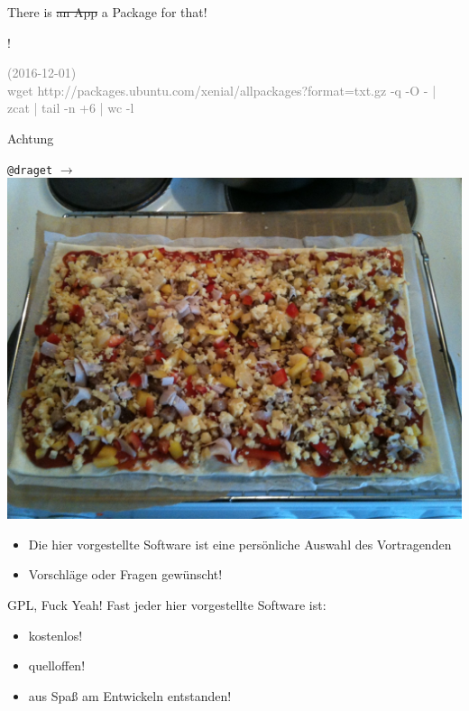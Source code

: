 \begin{frame}{There is \st{an App} a Package for that!}

\begin{center}
{\fontsize{100}{90}!}
\end{center}
\vfill

\textcolor{gray}{\tiny (2016-12-01) \\ wget http://packages.ubuntu.com/xenial/allpackages?format=txt.gz -q -O - | zcat | tail -n +6 | wc -l}
\end{frame}


\begin{frame}{Achtung}
\begin{center}
\texttt{@draget} $ \rightarrow $ \includegraphics[scale=0.12]{images/draget}
\end{center}
\begin{itemize}
\item Die hier vorgestellte Software ist eine persönliche Auswahl des Vortragenden
\item Vorschläge oder Fragen gewünscht!
\end{itemize}
\end{frame}

\begin{frame}{GPL, Fuck Yeah!}
Fast jeder hier vorgestellte Software ist:
\begin{itemize}
\item kostenlos!
\item quelloffen!
\item aus Spaß am Entwickeln entstanden!
\end{itemize}
\end{frame}